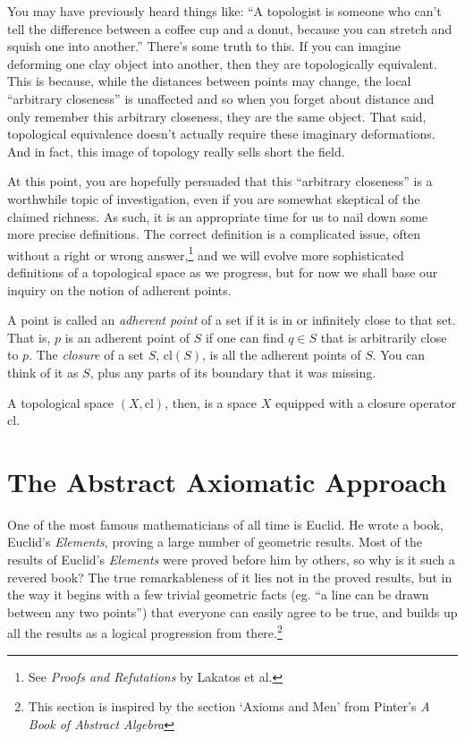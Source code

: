 \documentclass{report}
\newcommand{\cl}{\mathrm{cl}}
\begin{document}
You may have previously heard things like: ``A topologist is someone who can't tell the difference between a coffee cup and a donut, because you can stretch and squish one into another.'' There's some truth to this. If you can imagine deforming one clay object into another, then they are topologically equivalent. This is because, while the distances between points may change, the local ``arbitrary closeness'' is unaffected and so when you forget about distance and only remember this arbitrary closeness, they are the same object. That said, topological equivalence doesn't actually require these imaginary deformations. And in fact, this image of topology really sells short the field.

At this point, you are hopefully persuaded that this ``arbitrary closeness'' is a worthwhile topic of investigation, even if you are somewhat skeptical of the claimed richness. As such, it is an appropriate time for us to nail down some more precise definitions. The correct definition is a complicated issue, often without a right or wrong answer,\footnote{See \emph{Proofs and Refutations} by Lakatos et al.} and we will evolve more sophisticated definitions of a topological space as we progress, but for now we shall base our inquiry on the notion of adherent points.

A point is called an \emph{adherent point} of a set if it is in or infinitely close to that set. That is, $p$ is an adherent point of $S$ if one can find $q ∈ S$ that is arbitrarily close to $p$. The \emph{closure} of a set $S$, $\cl(S)$, is all the adherent points of $S$. You can think of it as $S$, plus any parts of its boundary that it was missing.

A topological space $(X, \cl)$, then, is a space $X$ equipped with a closure operator $\cl$.

\section{The Abstract Axiomatic Approach}

One of the most famous mathematicians of all time is Euclid. He wrote a book, Euclid's \emph{Elements}, proving a large number of geometric results. Most of the results of Euclid's \emph{Elements} were proved before him by others, so why is it such a revered book? The true remarkableness of it lies not in the proved results, but in the way it begins with a few trivial geometric facts (eg. ``a line can be drawn between any two points'') that everyone can easily agree to be true, and builds up all the results as a logical progression from there.\footnote{This section is inspired by the section `Axioms and Men' from Pinter's \emph{A Book of Abstract Algebra}}
\end{document}
